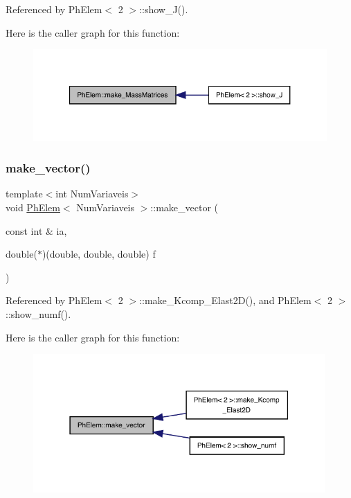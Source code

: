 Referenced by Ph\+Elem$<$ 2 $>$\+::show\+\_\+\+J().

Here is the caller graph for this function\+:
\nopagebreak
\begin{figure}[H]
\begin{center}
\leavevmode
\includegraphics[width=321pt]{classPhElem_ae538fb941f4cedc88e27dd28f2460bb5_icgraph}
\end{center}
\end{figure}
\mbox{\label{classPhElem_a5051606f1d1e914d52d3de8655195c9f}} 
\subsubsection{\texorpdfstring{make\+\_\+vector()}{make\_vector()}}
{\footnotesize\ttfamily template$<$int Num\+Variaveis$>$ \\
void \hyperlink{classPhElem}{Ph\+Elem}$<$ Num\+Variaveis $>$\+::make\+\_\+vector (\begin{DoxyParamCaption}\item[{const int \&}]{ia,  }\item[{double($\ast$)(double, double, double)}]{f }\end{DoxyParamCaption})}



Referenced by Ph\+Elem$<$ 2 $>$\+::make\+\_\+\+Kcomp\+\_\+\+Elast2\+D(), and Ph\+Elem$<$ 2 $>$\+::show\+\_\+numf().

Here is the caller graph for this function\+:
\nopagebreak
\begin{figure}[H]
\begin{center}
\leavevmode
\includegraphics[width=316pt]{classPhElem_a5051606f1d1e914d52d3de8655195c9f_icgraph}
\end{center}
\end{figure}
\mbox{\label{classPhElem_ad5732b2fb83ab0d9a2de7678391f87c4}} 
